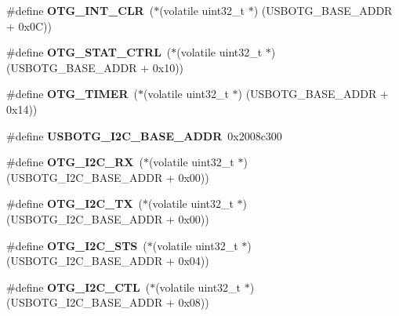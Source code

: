 \begin{DoxyCompactItemize}
\#define {\bfseries O\+T\+G\+\_\+\+I\+N\+T\+\_\+\+C\+LR}~($\ast$(volatile uint32\+\_\+t $\ast$) (U\+S\+B\+O\+T\+G\+\_\+\+B\+A\+S\+E\+\_\+\+A\+D\+DR + 0x0\+C))
\item 
\mbox{\label{group__lpc24xx__regs_ga6d71dd8601a823f740bb221f2402abd8}} 
\#define {\bfseries O\+T\+G\+\_\+\+S\+T\+A\+T\+\_\+\+C\+T\+RL}~($\ast$(volatile uint32\+\_\+t $\ast$) (U\+S\+B\+O\+T\+G\+\_\+\+B\+A\+S\+E\+\_\+\+A\+D\+DR + 0x10))
\item 
\mbox{\label{group__lpc24xx__regs_ga0759d44e1190ea7b1c8d1e33ba02dfbc}} 
\#define {\bfseries O\+T\+G\+\_\+\+T\+I\+M\+ER}~($\ast$(volatile uint32\+\_\+t $\ast$) (U\+S\+B\+O\+T\+G\+\_\+\+B\+A\+S\+E\+\_\+\+A\+D\+DR + 0x14))
\item 
\mbox{\label{group__lpc24xx__regs_gac17b9a6ab01cfca6a5870ad951084b10}} 
\#define {\bfseries U\+S\+B\+O\+T\+G\+\_\+\+I2\+C\+\_\+\+B\+A\+S\+E\+\_\+\+A\+D\+DR}~0x2008c300
\item 
\mbox{\label{group__lpc24xx__regs_ga95439ab33ec79ec76058d766adce6594}} 
\#define {\bfseries O\+T\+G\+\_\+\+I2\+C\+\_\+\+RX}~($\ast$(volatile uint32\+\_\+t $\ast$) (U\+S\+B\+O\+T\+G\+\_\+\+I2\+C\+\_\+\+B\+A\+S\+E\+\_\+\+A\+D\+DR + 0x00))
\item 
\mbox{\label{group__lpc24xx__regs_gac9c1c39fde39e56e77785ddfaf923d48}} 
\#define {\bfseries O\+T\+G\+\_\+\+I2\+C\+\_\+\+TX}~($\ast$(volatile uint32\+\_\+t $\ast$) (U\+S\+B\+O\+T\+G\+\_\+\+I2\+C\+\_\+\+B\+A\+S\+E\+\_\+\+A\+D\+DR + 0x00))
\item 
\mbox{\label{group__lpc24xx__regs_gaf9bc045f908e139fff92881dd05fdf72}} 
\#define {\bfseries O\+T\+G\+\_\+\+I2\+C\+\_\+\+S\+TS}~($\ast$(volatile uint32\+\_\+t $\ast$) (U\+S\+B\+O\+T\+G\+\_\+\+I2\+C\+\_\+\+B\+A\+S\+E\+\_\+\+A\+D\+DR + 0x04))
\item 
\mbox{\label{group__lpc24xx__regs_gae93dee948c7e3158fa03ba0fde03f4d2}} 
\#define {\bfseries O\+T\+G\+\_\+\+I2\+C\+\_\+\+C\+TL}~($\ast$(volatile uint32\+\_\+t $\ast$) (U\+S\+B\+O\+T\+G\+\_\+\+I2\+C\+\_\+\+B\+A\+S\+E\+\_\+\+A\+D\+DR + 0x08))
\item 
\mbox{\label{group__lpc24xx__regs_ga35a710024cd93ae2c9e7f362ebcbcd9e}} 

\end{DoxyCompactItemize}
